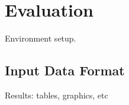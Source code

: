 \section{Evaluation}

Environment setup.

\subsection{Input Data Format}

Results: tables, graphics, etc
